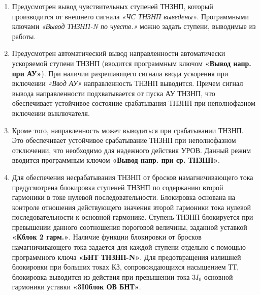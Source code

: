 \begin{enumerate}
\begin{enumerate}
\begin{itemize}
	\item \textit{Откл.} -- режим работы ступени не зависит от БНН;
	\item \textit{ОНМ} -- ступень переводится в ненаправленный режим работы;
	\item \textit{ТНЗНП} --  при срабатывании БНН ступень выводится из работы (однако, если ступень задана ненаправленной, то она останется в работе независимо от срабатывания БНН; ступень также не будет выводиться из работы, если направленность автоматически вывелась при срабатывании ТНЗНП или в процессе автоматического ускорения).
\end{itemize}

\item
Предусмотрен вывод чувствительных ступеней ТНЗНП, который производится от внешнего сигнала \textit{«ЧС ТНЗНП выведены»}. Программными ключами \textit{«Вывод ТНЗНП-N по чувств.»} можно задать ступени, выводимые из работы.

\item
Предусмотрен автоматический вывод направленности автоматически ускоряемой ступени ТНЗНП (вводится программным ключом \textbf{«Вывод напр. при АУ»}). При наличии разрешающего сигнала ввода ускорения при включении \textit{«Ввод АУ»} направленность ТНЗНП выводится. Причем сигнал вывода направленности подхватывается от пуска АУ ТНЗНП, что обеспечивает устойчивое состояние срабатывания ТНЗНП при неполнофазном включении выключателя. 

\item
Кроме того, направленность может выводиться при срабатывании ТНЗНП. Это обеспечивает устойчивое срабатывание ТНЗНП при неполнофазном отключении, что необходимо для надежного действия УРОВ. Данный режим вводится программным ключом \textbf{«Вывод напр. при ср. ТНЗНП»}.

\item
Для обеспечения несрабатывания ТНЗНП от бросков намагничивающего тока предусмотрена блокировка ступеней ТНЗНП по содержанию второй гармоники в токе нулевой последовательности. 
Блокировка основана на контроле отношения действующего значения второй гармоники тока нулевой последовательности к основной гармонике. Ступень ТНЗНП блокируется при превышении данного соотношения пороговой величины, заданной уставкой \textbf{«Кблок 2 гарм.»}. Наличие функции блокировки от бросков намагничивающего тока задается для каждой ступени отдельно с помощью программного ключа \textbf{«БНТ ТНЗНП-N»}. Для предотвращения излишней блокировки при больших токах КЗ, сопровождающихся насыщением ТТ, блокировка выводится из действия при превышении тока $3I_0$ основной гармоники уставки \textbf{«3I0блок ОВ БНТ»}.


\end{enumerate}
\end{enumerate}
